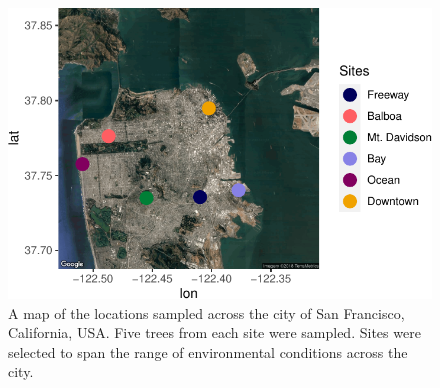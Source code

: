 \documentclass[fleqn,10pt,lineno]{wlpeerj} %
\begin{document}
\begin{figure}
\centering
\includegraphics{gibson2021_files/figure-latex/map-1.pdf}
\caption{\label{fig:map}A map of the locations sampled across the city of San Francisco, California, USA. Five trees from each site were sampled. Sites were selected to span the range of environmental conditions across the city.}
\end{figure}
\end{document}
